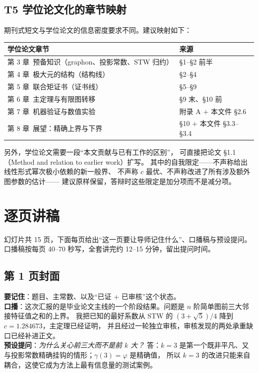 \documentclass[UTF8,11pt]{ctexart}
\begin{document}
\subsection{T5 学位论文化的章节映射}

期刊式短文与学位论文的信息密度要求不同。建议映射如下：
\begin{center}
\small
\begin{tabular}{ll}
\toprule
学位论文章节 & 来源 \\
\midrule
第 3 章\ 预备知识（graphon、投影常数、STW 归约） & \S1--\S2 前半 \\
第 4 章\ 极大元的结构（结构线） & \S2--\S4 \\
第 5 章\ 联合矩证书（证书线） & \S5--\S9 \\
第 6 章\ 主定理与有限图转移 & \S9 末、\S10 前 \\
第 7 章\ 机器验证与数值实验 & 附录 A $+$ 本文件 \S2.6 \\
第 8 章\ 展望：精确上界与下界 & \S10 $+$ 本文件 \S3.3--\S3.4 \\
\bottomrule
\end{tabular}
\end{center}
另外，学位论文需要一段``本文贡献与已有工作的区别''，
可直接把论文 \S1.1（Method and relation to earlier work）扩写。
其中的自我限定——不声称给出线性形式幂次极小依赖的新一般界、
不声称 $c$ 最优、不声称改进了所有涉及额外图参数的估计——
建议原样保留，答辩时这些限定是加分项而不是减分项。

\section{逐页讲稿}

幻灯片共 15 页，下面每页给出``这一页要让导师记住什么''、口播稿与预设提问。
口播稿按每页 40--70 秒写，全套讲完约 12--15 分钟，留出提问时间。

\subsection*{第 1 页\quad 封面}
\textbf{要记住}：题目、主常数、以及``已证 + 已审核''这个状态。\\
\textbf{口播}：这次汇报的是毕业论文主线的一个阶段结果。问题是 $n$ 阶简单图前三大邻接特征值之和的上界。
我把已知的最好系数从 STW 的 $(3+\sqrt5)/4$ 降到 $c=1.284673$，主定理已经证明，
并且经过一轮独立审核，审核发现的两处承重缺口已经补进正文。\\
\textbf{预设提问}：\emph{为什么关心前三大而不是前 $k$ 大？}
答：$k=3$ 是第一个既非平凡、又与投影常数精确挂钩的情形；$\gamma(3)=\varphi$ 是精确值，
所以 $k=3$ 的改进只能来自耦合，这使它成为方法上最有信息量的测试案例。
\end{document}
